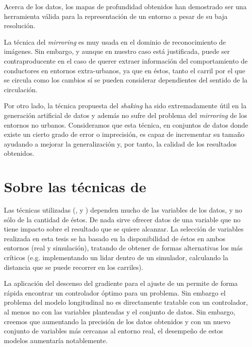 Acerca de los datos, los mapas de profundidad obtenidos han demostrado ser una herramienta válida para la representación de un entorno a pesar de su baja resolución.

La técnica del \textit{mirroring} es muy usada en el dominio de reconocimiento de imágenes. Sin embargo, y aunque en nuestro caso está justificada, puede ser contraproducente en el caso de querer extraer información del comportamiento de conductores en entornos extra-urbanos, ya que en éstos, tanto el carril por el que se circula como los cambios sí se pueden considerar dependientes del sentido de la circulación.

Por otro lado, la técnica propuesta del \textit{shaking} ha sido extremadamente útil en la generación artificial de datos y además no sufre del problema del \textit{mirroring} de los entornos no urbanos. Consideramos que esta técnica, en conjuntos de datos donde existe un cierto grado de error o imprecisión, es capaz de incrementar su tamaño ayudando a mejorar la generalización y, por tanto, la calidad de los resultados obtenidos.

\section{Sobre las técnicas de }

Las técnicas utilizadas (,  y ) dependen mucho de las variables de los datos, y no sólo de la cantidad de éstos. De nada sirve ofrecer datos de una variable que no tiene impacto sobre el resultado que se quiere alcanzar. La selección de variables realizada en esta tesis se ha basado en la disponibilidad de éstos en ambos entornos (real y simulación), tratando de obtener de formas alternativas los más críticos (e.g. implementando un \acrshort{lidar} dentro de un simulador, calculando la distancia que se puede recorrer en los carriles).

La aplicación del descenso del gradiente para el ajuste de un  permite de forma rápida encontrar un controlador óptimo para un problema. Sin embargo el problema del modelo longitudinal no es directamente tratable con un controlador, al menos no con las variables planteadas y el conjunto de datos. Sin embargo, creemos que aumentando la precisión de los datos obtenidos y con un nuevo conjunto de variables más cercanas al entorno real, el desempeño de estos modelos aumentaría notablemente.

